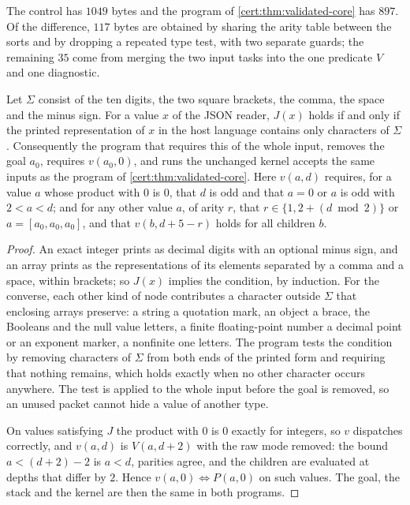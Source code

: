 The control has $1049$ bytes and the program of
\cref{cert:thm:validated-core} has $897$. Of the difference, $117$ bytes are
obtained by sharing the arity table between the sorts and by dropping a
repeated type test, with two separate guards; the remaining $35$ come from
merging the two input tasks into the one predicate $V$ and one diagnostic.

\begin{theorem}\label{cert:thm:repr}
Let $\Sigma$ consist of the ten digits, the two square brackets, the comma,
the space and the minus sign. For a value $x$ of the JSON reader, $J(x)$ holds
if and only if the printed representation of $x$ in the host language
contains only characters of $\Sigma$. Consequently the program that requires
this of the whole input, removes the goal $a_0$, requires $v(a_0,0)$, and runs
the unchanged kernel accepts the same inputs as the program of
\cref{cert:thm:validated-core}. Here $v(a,d)$ requires, for a value $a$ whose
product with $0$ is $0$, that $d$ is odd and that $a=0$ or $a$ is odd with
$2<a<d$; and for any other value $a$, of arity $r$, that
$r\in\{1,2+(d\bmod 2)\}$ or $a=[a_0,a_0,a_0]$, and that $v(b,d+5-r)$ holds for
all children $b$.
\end{theorem}
\begin{proof}
An exact integer prints as decimal digits with an optional minus sign, and an
array prints as the representations of its elements separated by a comma and
a space, within brackets; so $J(x)$ implies the condition, by induction. For
the converse, each other kind of node contributes a character outside
$\Sigma$ that enclosing arrays preserve: a string a quotation mark, an object
a brace, the Booleans and the null value letters, a finite floating-point
number a decimal point or an exponent marker, a nonfinite one letters. The
program tests the condition by removing characters of $\Sigma$ from both ends
of the printed form and requiring that nothing remains, which holds exactly
when no other character occurs anywhere. The test is applied to the whole
input before the goal is removed, so an unused packet cannot hide a value of
another type.

On values satisfying $J$ the product with $0$ is $0$ exactly for integers, so
$v$ dispatches correctly, and $v(a,d)$ is $V(a,d+2)$ with the raw mode
removed: the bound $a<(d+2)-2$ is $a<d$, parities agree, and the children
are evaluated at depths that differ by $2$. Hence $v(a,0)\iff P(a,0)$ on such
values. The goal, the stack and the kernel are then the same in both
programs.
\end{proof}


